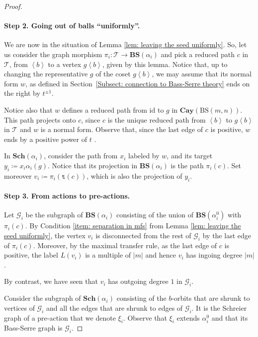 \documentclass[12pt]{article}
\numberwithin{equation}{section}
\theoremstyle{definition}
\newcommand{\la}{\left\langle}
\newcommand{\ra}{\right\rangle}
\newcommand{\abs}[1]{\left\lvert #1\right\rvert}
\newcommand{\Gc}{\mathcal{G}}
\def\id{\mathrm{id}}
\newcommand\BSo{\mathrm{BS}}
\newcommand\BSe{\mathbf{BS}}
\newcommand{\Sch}{\mathbf{Sch}}
\newcommand\Schreier{\Sch}
\newcommand\Cayley{\mathbf{Cay}}
\newcommand\Tree{\mathcal{T}}
\newcommand{\target}{\mathtt{t}}
\newcommand\pathinT{c}
\begin{document}
\begin{proof}
	\paragraph{Step 2. Going out of balls ``uniformly''.}	
	
	We are now in the situation of Lemma \ref{lem: leaving the seed uniformly}.
	So, let us
	consider the graph morphism $\pi_i:\Tree \to \BSe(\alpha_i)$ and
	pick a reduced path $\pathinT$ in $\Tree$, from $\la b\ra$ to a vertex $g \la b \ra$, given by this lemma.
	Notice that, up to changing the representative $g$ of the coset $g \la b \ra$,
	we may assume that its normal form $w$,
	as defined in Section~\ref{Subsect: connection to Bass-Serre theory}
	ends on the right by $t^{\pm 1}$.

	Notice also that $w$ defines a reduced path from $\id$ to $g$ in $\Cayley(\BSo(m,n))$.
	This path projects onto $\pathinT$, since $\pathinT$ is the unique reduced path from $\la b\ra$ to $g \la b \ra$ in $\Tree$ and $w$ is a normal form.
	Observe that, since the last edge of $\pathinT$ is positive,
	$w$ ends by a positive power of \( t \) .
	
	In $\Schreier(\alpha_i)$, consider the path from $x_i$ labeled by $w$, and its target $y_i\coloneqq x_i \alpha_i(g)$.
	Notice that its projection in $\BSe(\alpha_i)$ is the path $\pi_i(c)$.
	Set moreover $v_i \coloneqq \pi_i(\target(c))$, which is also the projection of $y_i$.
	
	\paragraph{Step 3. From actions to pre-actions.}
	    
	Let $\Gc_i$ be the subgraph of $\BSe(\alpha_i)$ consisting of the union of $\BSe(\alpha_i^0)$ with $\pi_i(c)$.
	By Condition \ref{item: separation in mfs} from Lemma \ref{lem: leaving the seed uniformly}, the vertex
	$v_i$ is disconnected from the rest of $\Gc_i$ by the last edge of $\pi_i(c)$.
	Moreover, by the maximal transfer rule, as the last edge of \( c \) is positive, 
	the label $L(v_i)$ is a multiple of $\abs{m}$ and hence $v_i$ has ingoing degree $\abs{m}$.
	
	By contrast, we have seen that $v_i$ has outgoing degree $1$ in $\Gc_i$.



    Consider the subgraph of $\Sch(\alpha_i)$ consisting of the \( b \)-orbits that are shrunk to vertices of $\Gc_i$ 
    and all the edges that are shrunk to edges of $\Gc_i$. 
    It is the Schreier graph of a pre-action that we denote $\xi_i$. 
    Observe that $\xi_i$ extends $\alpha_i^0$ and that its Bass-Serre graph is $\Gc_i$.


\end{proof}
\end{document}
